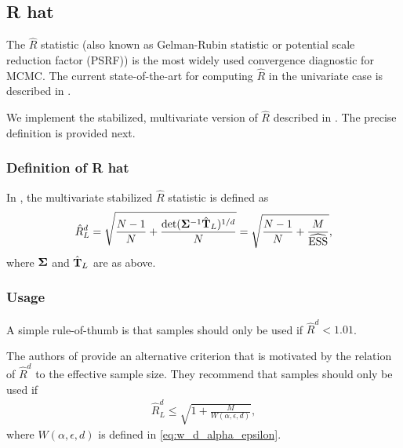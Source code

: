 \documentclass[10pt]{article}
\numberwithin{equation}{section}
\begin{document}
\subsection{R hat}

The $\hat R$ statistic (also known as Gelman-Rubin statistic or  potential scale reduction factor (PSRF)) is the most widely used convergence diagnostic for MCMC. The current state-of-the-art for computing $\hat R$ in the univariate case is described in \cite{VehGelSimCarBur21}.

We implement the stabilized, multivariate version of $\hat R$ described in \cite{VatKnu21}. The precise definition is provided next.

\subsubsection*{Definition of R hat}

In \cite{VatKnu21}, the multivariate stabilized $\hat R$ statistic is defined as
\begin{align*}
\hat R^d_L = \sqrt{ \frac{N-1}{N} + \frac{\det(\mathbf{\Sigma}^{-1} \hat{\mathbf{T}}_L)^{1/d}}{N} } = \sqrt{ \frac{N-1}{N} + \frac{M}{\widehat{\mathrm{ESS}}}},
\end{align*}
where $\mathbf{\Sigma}$ and $\hat{\mathbf{T}}_L$ are as above.


\subsubsection*{Usage}

A simple rule-of-thumb \cite{VehGelSimCarBur21} is that samples should only be used if $\hat R^d < 1.01$.

The authors of \cite{VatKnu21} provide an alternative criterion that is motivated by the relation of $\hat R^d$ to the effective sample size. They recommend that samples should only be used if
\begin{align*}
\hat R^d_L \leq \sqrt{1 + \frac{M}{W(\alpha, \epsilon, d)}},
\end{align*}
where $W(\alpha, \epsilon, d)$ is defined in \eqref{eq:w_d_alpha_epsilon}.







\printbibliography
\end{document}
